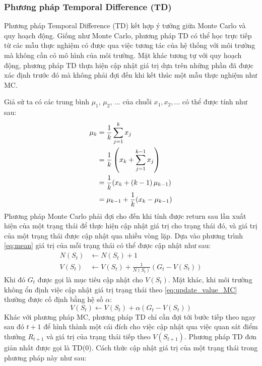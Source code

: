 \subsubsection{Phương pháp Temporal Difference (TD)}
Phương pháp Temporal Difference (TD) kết hợp ý tưởng giữa Monte Carlo và quy hoạch động. Giống như Monte Carlo, phương pháp TD có thể học trực tiếp từ các mẫu thực nghiệm có được qua việc tương tác của hệ thống với môi trường mà không cần có mô hình của môi trường. Mặt khác tương tự với quy hoạch động, phương pháp TD thựa hiện cập nhật giá trị dựa trên những phần đã được xác định trước đó mà không phải đợi đến khi kết thúc một mẫu thực nghiệm như MC.

Giả sử ta có các trung bình $\mu_{1}$, $\mu_{2}$, ... của chuỗi $x_1, x_2, ...$ có thể được tính như sau:
\begin{align}
\mu_{k} = {}& \frac{1}{k}\sum_{j=1}^{k}x_{j} \notag \\
= {}& \frac{1}{k} \left(x_k + \sum_{j = 1}^{k - 1}x_j\right) \notag \\
= {}& \frac{1}{k}(x_k + \left(k - 1\right)\mu_{k-1}) \notag \\
= {}& \mu_{k - 1} + \frac{1}{k}(x_k - \mu_{k-1}) \label{eq:mean}
\end{align}
Phương pháp Monte Carlo phải đợi cho đến khi tính được return sau lần xuất hiện của một trạng thái để thực hiện cập nhật giá trị cho trạng thái đó, và giá trị của một trạng thái được cập nhật qua nhiều vòng lặp. Dựa vào phương trình \ref{eq:mean} giá trị của mỗi trạng thái có thể được cập nhật như sau:
\begin{align}
N(\mathit{S}_{t}) & \leftarrow N(\mathit{S}_{t}) + 1 \\
V(\mathit{S}_t) & \leftarrow V(\mathit{S}_t) + \frac{1}{N(\mathit{S}_{t})}(\mathit{G_t} - V(\mathit{S}_t)) \label{eq:update_value_MC}
\end{align}
Khi đó $\mathit{G}_t$ được gọi là mục tiêu cập nhật cho $V(S_t)$. Mặt khác, khi môi trường không ổn định việc cập nhật giá trị trạng thái theo \ref{eq:update_value_MC}  thường được cố định bằng hệ số $\alpha$:
\begin{equation}
V(\mathit{S}_t) \leftarrow V(\mathit{S}_t) + \alpha(\mathit{G_t} - V(\mathit{S}_t))
\end{equation}
Khác với phương pháp MC, phương pháp TD chỉ cần đợi tới bước tiếp theo ngay sau đó $t+1$ để hình thành một cái đích cho việc cập nhật qua việc quan sát điểm thưởng $R_{t+1}$ và giá trị của trạng thái tiếp theo $V(\mathit{S}_{t+1})$. Phương pháp TD đơn giản nhất được gọi là TD(0). Cách thức cập nhật giá trị của một trạng thái trong phương pháp này như sau:
